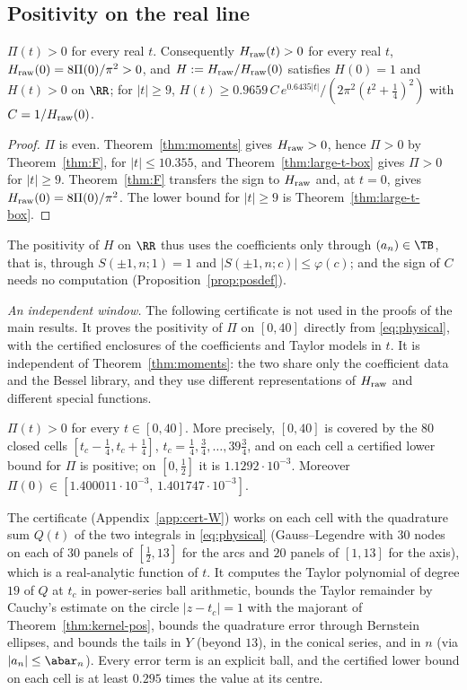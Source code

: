 \subsection{Positivity on the real line}

\begin{corollary}\label{cor:Pi-positive}
$\Pi(t)>0$ for every real $t$. Consequently $H_{\rm raw}(t)>0$ for every real $t$, $H_{\rm raw}(0)=8\Pi(0)/\pi^2>0$, and
$H:=H_{\rm raw}/H_{\rm raw}(0)$ satisfies $H(0)=1$ and $H(t)>0$ on $\RR$; for $|t|\ge9$,
$H(t)\ge0.9659\,C\,e^{0.6435|t|}/(2\pi^2(t^2+\frac14)^2)$ with $C=1/H_{\rm raw}(0)$.
\end{corollary}

\begin{proof}
$\Pi$ is even. Theorem~\ref{thm:moments} gives $H_{\rm raw}>0$, hence $\Pi>0$ by Theorem~\ref{thm:F}, for $|t|\le10.355$, and
Theorem~\ref{thm:large-t-box} gives $\Pi>0$ for $|t|\ge9$. Theorem~\ref{thm:F} transfers the sign to $H_{\rm raw}$ and, at $t=0$, gives
$H_{\rm raw}(0)=8\Pi(0)/\pi^2$. The lower bound for $|t|\ge9$ is Theorem~\ref{thm:large-t-box}.
\end{proof}

The positivity of $H$ on $\RR$ thus uses the coefficients only through $(a_n)\in\TB$, that is, through $S(\pm1,n;1)=1$ and
$|S(\pm1,n;c)|\le\varphi(c)$; and the sign of $C$ needs no computation (Proposition~\ref{prop:posdef}).

\emph{An independent window.} The following certificate is not used in the proofs of the main results. It proves the positivity of $\Pi$ on
$[0,40]$ directly from \eqref{eq:physical}, with the certified enclosures of the coefficients and Taylor models in $t$. It is independent of
Theorem~\ref{thm:moments}: the two share only the coefficient data and the Bessel library, and they use different representations of $H_{\rm raw}$
and different special functions.

\begin{theorem}\label{thm:window}
$\Pi(t)>0$ for every $t\in[0,40]$. More precisely, $[0,40]$ is covered by the $80$ closed cells $[t_c-\frac14,t_c+\frac14]$,
$t_c=\frac14,\frac34,\dots,39\frac34$, and on each cell a certified lower bound for $\Pi$ is positive; on $[0,\frac12]$ it is
$1.1292\cdot10^{-3}$. Moreover $\Pi(0)\in[1.400011\cdot10^{-3},\,1.401747\cdot10^{-3}]$.
\end{theorem}

The certificate (Appendix~\ref{app:cert-W}) works on each cell with the quadrature sum $Q(t)$ of the two integrals in \eqref{eq:physical} (Gauss--Legendre
with $30$ nodes on each of $30$ panels of $[\frac12,13]$ for the arcs and $20$ panels of $[1,13]$ for the axis), which is a real-analytic function of
$t$. It computes the Taylor polynomial of degree $19$ of $Q$ at $t_c$ in power-series ball arithmetic, bounds the Taylor remainder by Cauchy's
estimate on the circle $|z-t_c|=1$ with the majorant of Theorem~\ref{thm:kernel-pos}, bounds the quadrature error through Bernstein ellipses, and
bounds the tails in $Y$ (beyond $13$), in the conical series, and in $n$ (via $|a_n|\le\abar_n$). Every error term is an explicit ball, and the
certified lower bound on each cell is at least $0.295$ times the value at its centre.

